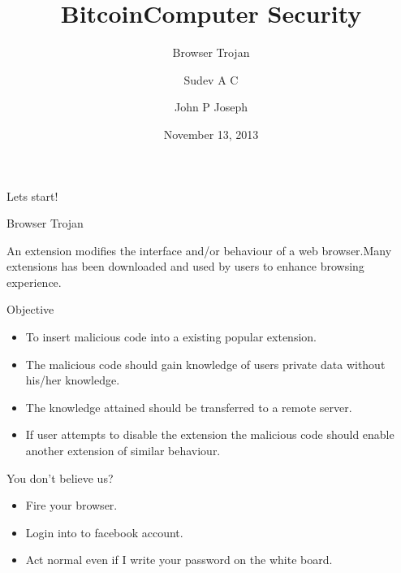 \documentclass{beamer}
\author{Sudev A C}
\title{Bitcoin}
\institute{NIT Calicut}
\title[Computer Security]{Computer Security}
\subtitle[Browser Trojan]{Browser Trojan}
\author[John P Joseph]{John P Joseph}
\institute[NITC]{
  Department of Computer Science\\
  National Institute of Technology Calicut\\[1ex]
}
\date[November 2013]{November 13, 2013}
\begin{document}
\begin{frame}[plain]
  \titlepage
\end{frame}
\begin{frame}{Lets start!}
\begin{Huge}
Browser Trojan \linebreak \linebreak
\end{Huge}

An extension modifies the interface and/or behaviour of a web browser.Many extensions has been downloaded and used by users to enhance browsing experience.
\end{frame}

\begin{frame}{Objective}
\begin{itemize}
\item To insert malicious code into a existing popular extension.
\item The malicious code should gain knowledge of users private data without his/her knowledge.
\item The knowledge attained should be transferred to a remote server.
\item If user attempts to disable the extension the malicious code should enable another extension of similar behaviour.
\end{itemize}

\end{frame}


\begin{frame}{You don't believe us?}
\begin{itemize}
\item Fire your browser.
\item Login into to facebook account.
\item Act normal even if I write your password on the white board.
\end{itemize}
\end{frame}
\end{document}
